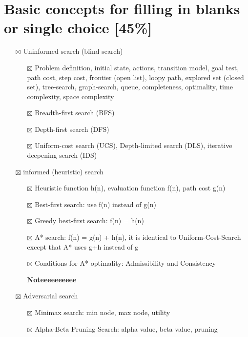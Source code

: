 \documentclass[11pt]{article}
\begin{document}
\section{Basic concepts for filling in blanks or single choice [45\%]}
\label{sec:org82e9675}
\begin{itemize}
\item[{$\boxtimes$}] Uninformed search (blind search)
\begin{itemize}
\item[{$\boxtimes$}] Problem definition, initial state, actions, transition model, goal
test, path cost, step cost, frontier (open list), loopy path, explored set
(closed set), tree-search, graph-search, queue, completeness, optimality,
time complexity, space complexity
\item[{$\boxtimes$}] Breadth-first search (BFS)
\item[{$\boxtimes$}] Depth-first search (DFS)
\item[{$\boxtimes$}] Uniform-cost search (UCS), Depth-limited search (DLS), iterative
deepening search (IDS)
\end{itemize}
\item[{$\boxtimes$}] informed (heuristic) search
\begin{itemize}
\item[{$\boxtimes$}] Heuristic function h(n), evaluation function f(n), path cost g(n)
\item[{$\boxtimes$}] Best-first search: use f(n) instead of g(n)
\item[{$\boxtimes$}] Greedy best-first search: f(n) = h(n)
\item[{$\boxtimes$}] A* search: f(n) = g(n) + h(n), it is identical to Uniform-Cost-Search
except that A* uses g+h instead of g
\item[{$\boxtimes$}] Conditions for A* optimality: Admissibility and Consistency

\textbf{Noteeeeeeeeee}
\end{itemize}
\item[{$\boxtimes$}] Adversarial search
\begin{itemize}
\item[{$\boxtimes$}] Minimax search: min node, max node, utility
\item[{$\boxtimes$}] Alpha-Beta Pruning Search: alpha value, beta value, pruning


\end{itemize}
\end{itemize}
\end{document}
